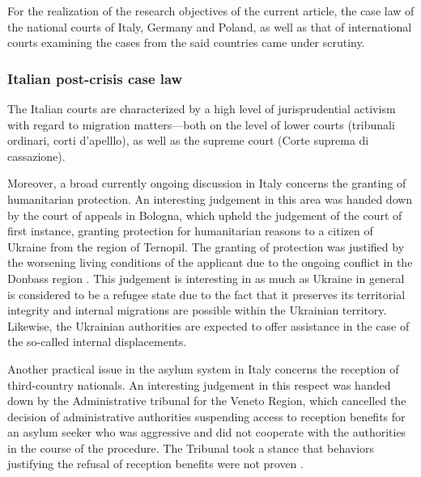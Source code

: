 \documentclass[10pt,a4paper]{article}
\begin{document}
\begin{multicols}{2}
\noindent For the realization of the research objectives of the current article, the case law of the national courts of Italy, Germany and Poland, as well as that of international courts examining the cases from the said countries came under scrutiny.

\subsubsection{Italian post-crisis case law}

\noindent The Italian courts are characterized by a high level of jurisprudential activism with regard to migration matters---both on the level of lower courts (tribunali ordinari, corti d'apelllo), as well as the supreme court (Corte suprema di cassazione).


Moreover, a broad currently ongoing discussion in Italy concerns the granting of humanitarian protection. An interesting judgement in this area was handed down by the court of appeals in Bologna, which upheld the judgement of the court of first instance, granting protection for humanitarian reasons to a citizen of Ukraine from the region of Ternopil. The granting of protection was justified by the worsening living conditions of the applicant due to the ongoing conflict in the Donbass region \citep{R73,R74}. This judgement is interesting in as much as Ukraine in general is considered to be a refugee state due to the fact that it preserves its territorial integrity and internal migrations are possible within the Ukrainian territory. Likewise, the Ukrainian authorities are expected to offer assistance in the case of the so-called internal displacements.

Another practical issue in the asylum system in Italy concerns the reception of third-country nationals. An interesting judgement in this respect was handed down by the Administrative tribunal for the Veneto Region, which cancelled the decision of administrative authorities suspending access to reception benefits for an asylum seeker who was aggressive and did not cooperate with the authorities in the course of the procedure. The Tribunal took a stance that behaviors justifying the refusal of reception benefits were not proven \citep{R75}.


\end{multicols}
\end{document}
